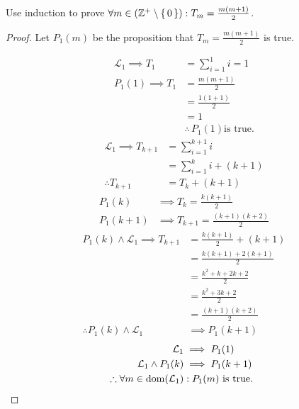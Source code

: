 \begin{question}
	Use induction to prove $\forall m \in ({\mathbb Z}^{+} \setminus \set{0} ) : T_m = \frac{m(m+1)}{2} $.
	\begin{proof}

		Let $P_1(m)$ be the proposition that $T_m = \frac{m(m+1)}{2}$ is true.

		\begin{align*}
			\mathcal L_1 \implies			T_1 & = \sum_{i=1}^{1}i = 1                       \\
			P_1(1) \implies T_1         & = \frac{m(m+1)}{2}                          \\
			                            & = \frac{1(1+1)}{2}                          \\
			                            & = 1                                         \\
			                            & \therefore\,         P_1(1) \text{is true.}
		\end{align*}
		\begin{align*}
			\mathcal L_1 \implies			T_{k+1}  & = \sum_{i=1}^{k+1}i       \\
			                                 & = \sum_{i=1}^{k}i + (k+1) \\
			\therefore															T_{k+1} & = T_k + (k+1)
		\end{align*}
		\begin{align*}
			P_1(k)   & \implies T_k                             = \frac{k(k+1)}{2} \\
			P_1(k+1) & \implies 	T_{k+1}  =\frac{(k+1)(k+2)}{2}
		\end{align*}
		\begin{align*}
			P_1(k) \wedge \mathcal{L}_1 \implies T_{k+1} & = \frac{k(k+1)}{2} + (k+1)   \\
			                                             & = \frac{k(k+1) + 2(k+1)}{2}  \\
			                                             & = \frac{k^2 + k + 2k + 2}{2} \\
			                                             & = \frac{k^2 + 3k + 2}{2}     \\
			                                             & =\frac{(k+1)(k+2)}{2}        \\
			\therefore P_1(k)\wedge \mathcal{L}_1        & \implies P_1(k+1)
		\end{align*}
		\begin{align*}
			\mathcal{L}_1                                               & \implies P_1(1)             \\
			\mathcal{L}_1 \wedge		P_1(k)                                & \implies P_1(k+1)           \\
			\therefore \forall m          \in {\operatorname{dom} }({\mathcal{L}_1}) & : P_1(m)  \text{ is true. }
		\end{align*}


	\end{proof}
\end{question}
